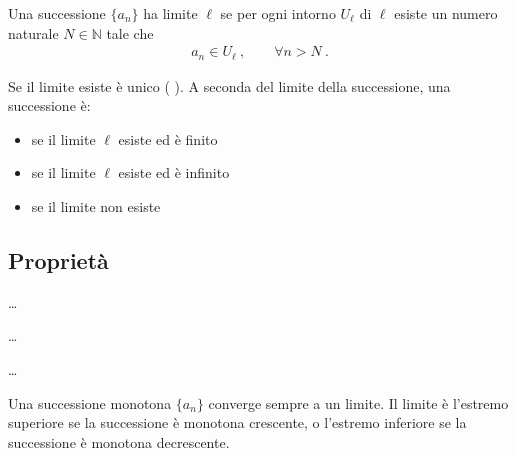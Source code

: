 \documentclass[letterpaper,10pt,italian]{jupyterBook}
\begin{document}
\sphinxAtStartPar
{} Una successione \(\{ a_n \}\) ha limite \(\ell\) se per ogni intorno \(U_{\ell}\) di \(\ell\) esiste un numero naturale \(N \in \mathbb{N}\) tale che
\begin{equation*}
\begin{split}a_n \in U_{\ell} \ , \qquad \forall n > N \ .\end{split}
\end{equation*}
\sphinxAtStartPar
{} 

\sphinxAtStartPar
Se il limite esiste è unico ( ). A seconda del limite della successione, una successione è:
\begin{itemize}
\item {} 
\sphinxAtStartPar
{} se il limite \(\ell\) esiste ed è finito

\item {} 
\sphinxAtStartPar
{} se il limite \(\ell\) esiste ed è infinito

\item {} 
\sphinxAtStartPar
{} se il limite non esiste

\end{itemize}


\subsection{Proprietà}
\label{\detokenize{ch/series:proprieta}}
\sphinxAtStartPar
{} …

\sphinxAtStartPar
{} …

\sphinxAtStartPar
{} …

\sphinxAtStartPar
{} Una successione monotona \(\{ a_n \}\) converge sempre a un limite. Il limite è l’estremo superiore se la successione è monotona crescente, o l’estremo inferiore se la successione è monotona decrescente.

\sphinxAtStartPar
{}

\sphinxAtStartPar
{}
\end{document}
